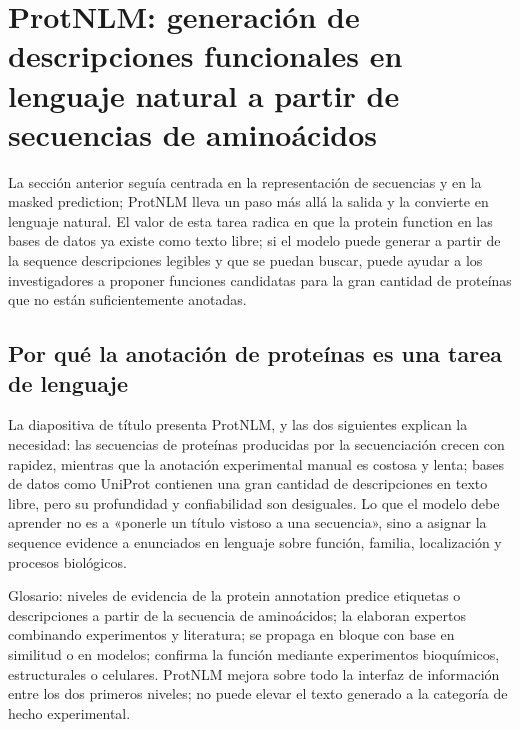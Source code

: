 \section{ProtNLM: generación de descripciones funcionales en lenguaje natural a partir de secuencias de aminoácidos}

La sección anterior seguía centrada en la representación de secuencias y en la masked prediction; ProtNLM lleva un paso más allá la salida y la convierte en lenguaje natural. El valor de esta tarea radica en que la protein function en las bases de datos ya existe como texto libre; si el modelo puede generar a partir de la sequence descripciones legibles y que se puedan buscar, puede ayudar a los investigadores a proponer funciones candidatas para la gran cantidad de proteínas que no están suficientemente anotadas.

\subsection{Por qué la anotación de proteínas es una tarea de lenguaje}

La diapositiva de título presenta ProtNLM, y las dos siguientes explican la necesidad: las secuencias de proteínas producidas por la secuenciación crecen con rapidez, mientras que la anotación experimental manual es costosa y lenta; bases de datos como UniProt contienen una gran cantidad de descripciones en texto libre, pero su profundidad y confiabilidad son desiguales. Lo que el modelo debe aprender no es a «ponerle un título vistoso a una secuencia», sino a asignar la sequence evidence a enunciados en lenguaje sobre función, familia, localización y procesos biológicos.




\begin{knowledgebox}{Glosario: niveles de evidencia de la protein annotation}
 predice etiquetas o descripciones a partir de la secuencia de aminoácidos;  la elaboran expertos combinando experimentos y literatura;  se propaga en bloque con base en similitud o en modelos;  confirma la función mediante experimentos bioquímicos, estructurales o celulares. ProtNLM mejora sobre todo la interfaz de información entre los dos primeros niveles; no puede elevar el texto generado a la categoría de hecho experimental.
\end{knowledgebox}


